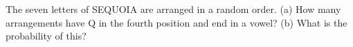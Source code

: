 The seven letters of SEQUOIA are arranged in a random order. (a) How many arrangements have Q in the fourth position and end in a vowel? (b) What is the probability of this?
